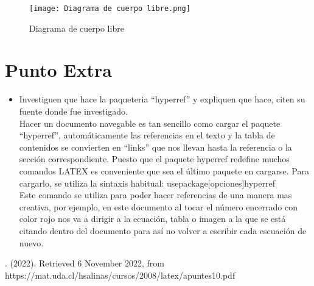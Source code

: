 \documentclass[letterpaper, 12pt]{article}
\begin{document}
    \begin{figure}
    \centering
        \caption{Diagrama de cuerpo libre }
    \texttt{[image: Diagrama de cuerpo libre.png]}

    \label{fig, diagrama}
\end{figure}

\pagestyle{fancy}

    \fancyhf{}
    \rfoot{\thepage}
    
\section{Punto Extra}
\begin{itemize}
    \item Investiguen que hace la paqueteria ``hyperref'' y expliquen que hace, citen su fuente
    donde fue investigado.\\
    
Hacer un documento navegable es tan sencillo como cargar el paquete ``hyperref'', automáticamente las referencias en el texto y la tabla de contenidos se convierten en ``links'' que nos llevan hasta la referencia o la sección correspondiente. Puesto que el paquete
hyperref redefine muchos comandos LATEX es conveniente que sea el último paquete
en cargarse.
Para cargarlo, se utiliza la sintaxis habitual:
usepackage[opciones]{hyperref}\\
Este comando se utiliza para poder hacer referencias de una manera mas creativa, por ejemplo, en este documento al tocar el número encerrado con color rojo nos va a dirigir a la ecuación, tabla o imagen a la que se está citando dentro del documento para así no volver a escribir cada escuación de nuevo.
\end{itemize}

\begin{thebibliography}{}
\bibitem{}. (2022). Retrieved 6 November 2022, from https://mat.uda.cl/hsalinas/cursos/2008/latex/apuntes10.pdf

\end{thebibliography}
\end{document}
